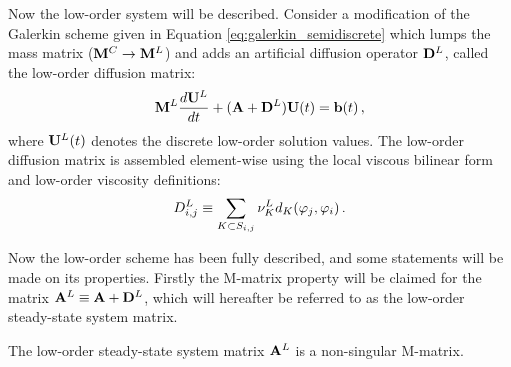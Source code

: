 Now the low-order system will be described.
Consider a modification of the Galerkin scheme given in Equation \eqref{eq:galerkin_semidiscrete}
which lumps the mass matrix ($\mathbf{M}^C \rightarrow \mathbf{M}^L$) and adds an artificial
diffusion operator $\mathbf{D}^L$, called the low-order diffusion matrix:
\begin{equation}
  \mathbf{M}^L\frac{d\mathbf{U}^L}{dt} + (\mathbf{A} + \mathbf{D}^L)\mathbf{U}(t) = \mathbf{b}(t) \,,
\end{equation}
where $\mathbf{U}^L(t)$ denotes the discrete low-order solution values. The low-order
diffusion matrix is assembled element-wise using the local viscous bilinear
form and low-order viscosity definitions:
\begin{equation}\label{eq:low_order_diffusion_matrix}
  D_{i,j}^L \equiv
    \sum\limits_{K\subset S_{i,j}}\nu^L_K
    d_K(\varphi_j,\varphi_i) \,.
\end{equation}

Now the low-order scheme has been fully described, and some statements will be
made on its properties. Firstly the M-matrix property will be claimed for
the matrix $\mathbf{A}^L\equiv\mathbf{A} + \mathbf{D}^L$, which will hereafter be referred to as the
low-order steady-state system matrix.
\begin{thm}
  The low-order steady-state system matrix $\mathbf{A}^L$ is a non-singular M-matrix.
\end{thm}


